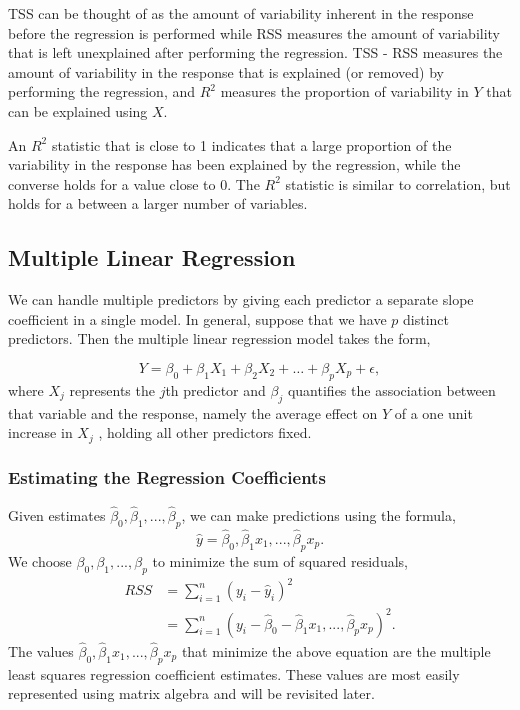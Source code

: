 \documentclass{article}
\begin{document}
TSS can be thought of as the amount of variability inherent in the response before the regression is performed while RSS measures the amount of variability that is left unexplained after performing the regression. TSS - RSS measures the amount of variability in the response that is explained (or
removed) by performing the regression, and $R^2$ measures the proportion of variability in $Y$ that can be explained using $X$.

An $R^2$ statistic that is close to 1 indicates that a large proportion of the variability in the response has been explained by the regression, while the converse holds for a value close to 0. The $R^2$ statistic is similar to correlation, but holds for a between a larger number of variables.

\subsection{Multiple Linear Regression}
We can handle multiple predictors by giving each predictor a separate slope coefficient in a single model. In general, suppose that we have $p$ distinct predictors. Then the multiple linear regression model takes the form,

\[
    Y = \beta_0 + \beta_1 X_1 + \beta_2 X_2 + \dots + \beta_p X_p + \epsilon,
\]
where $X_j$ represents the $j$th predictor and $\beta_j$ quantifies the association between that variable and the response, namely the average effect on $Y$ of a one unit increase in $X_j$ , holding all other predictors fixed.

\subsubsection{Estimating the Regression Coefficients}

Given estimates $\hat \beta_0, \hat \beta_1,..., \hat \beta_p$, we can make predictions using the formula,
\[
     \hat y= \hat \beta_0, \hat \beta_1 x_1,..., \hat \beta_p x_p.
\]
We choose $\beta_0, \beta_1,...,\beta_p$ to minimize the sum of squared residuals,
\begin{align*}
    RSS &= \sum_{i=1}^{n} (y_i - \hat y_i)^2 \\
    &=  \sum_{i=1}^{n}(y_i - \hat \beta_0 - \hat \beta_1 x_1,..., \hat \beta_p x_p)^2.
\end{align*}
The values $\hat \beta_0, \hat \beta_1 x_1,..., \hat \beta_p x_p$ that minimize the above equation are the multiple least squares regression coefficient estimates. These values are most easily represented using matrix algebra and will be revisited later.
\end{document}
